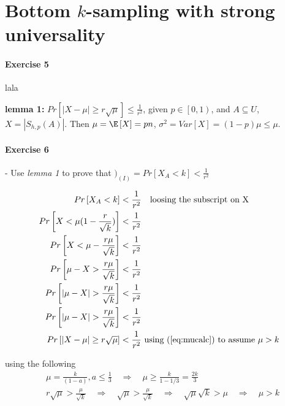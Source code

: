 \section{Bottom $k$-sampling with strong universality}

\paragraph{Exercise 5}
lala


\vspace{50mm}

\textbf{lemma 1:} $Pr\left[ |X - \mu| \geq r\sqrt{\mu} \right] \leq \frac{1}{r^2}$, given $p \in \left[0,1\right)$, and $A \subseteq U$, $X = |S_{h,p}(A)|$.
Then  $\mu = \E\left[ X \right] = p n$, $\sigma^2 = Var\left[ X \right] = (1-p)\mu \leq \mu$.


\paragraph{Exercise 6} - Use \textit{lemma 1} to prove that $)_{(I)} = Pr\left[ X_A < k \right] < \frac{1}{r^2}$

\begin{align}
  Pr \left[ X_A < k \right] &< \frac{1}{r^2} \quad \text{loosing the subscript on X} \\
  Pr \left[ X < \mu(1-\frac{r}{\sqrt{k}}) \right] &< \frac{1}{r^2}  \\
  Pr \left[ X < \mu -\frac{r \mu}{\sqrt{k}} \right] &< \frac{1}{r^2}  \\
  Pr \left[ \mu - X > \frac{r \mu}{\sqrt{k}} \right] &< \frac{1}{r^2}  \\
  Pr \left[ |\mu - X| > \frac{r \mu}{\sqrt{k}} \right] &< \frac{1}{r^2}  \\
  Pr \left[ |\mu - X| > \frac{r \mu}{\sqrt{k}} \right] &< \frac{1}{r^2}  \\
  Pr \left[ |X - \mu| \geq r \sqrt{\mu} \right] &< \frac{1}{r^2} \text{ using (\ref{eq:mucalc}) to assume } \mu > k
\end{align}

using the following
\begin{align}
  &\mu = \frac{k}{(1-a)}, a\leq\frac{1}{3}  \quad \Rightarrow \quad  \mu \geq \frac{k}{1-1/3} = \frac{2k}{3} \\
  &r \sqrt{\mu} > \frac{\mu}{\sqrt{k}} \quad \Rightarrow \quad \sqrt{\mu} > \frac{\mu}{\sqrt{k}} \quad \Rightarrow \quad \sqrt{\mu} \sqrt{k} > \mu \quad \Rightarrow \quad \mu > k \label{eq:mucalc}
\end{align}


